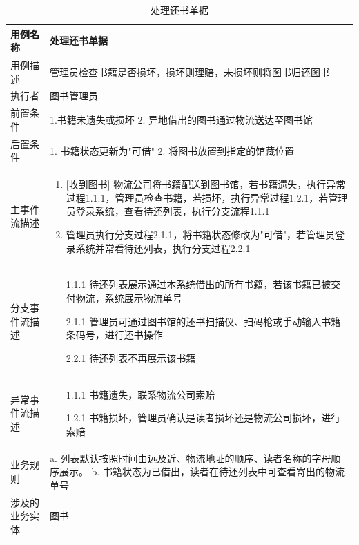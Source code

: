 \begin{table}[p]
    \centering
    \caption{处理还书单据}
	\begin{tabular*}{\textwidth}{p{}|p{}}
    \hline
    用例名称    & 处理还书单据   \\ \hline
    用例描述    & 管理员检查书籍是否损坏，损坏则理赔，未损坏则将图书归还图书   \\ \hline
    执行者     & 图书管理员        \\ \hline
    前置条件    & 1.书籍未遗失或损坏        2. 异地借出的图书通过物流送达至图书馆    \\ \hline
    后置条件    & 1. 书籍状态更新为"可借"       2. 将图书放置到指定的馆藏位置  \\ \hline
    主事件流描述  & \begin{enumerate} 
            \item  {[收到图书]} 物流公司将书籍配送到图书馆，若书籍遗失，执行异常过程1.1.1，管理员检查书籍，若损坏，执行异常过程1.2.1，若管理员登录系统，查看待还列表，执行分支流程1.1.1
            \item 管理员执行分支过程2.1.1，将书籍状态修改为"可借"，若管理员登录系统并常看待还列表，执行分支过程2.2.1
        \end{enumerate} \\ \hline
    分支事件流描述 & \begin{itemize}
        \item[1.1.1] 待还列表展示通过本系统借出的所有书籍，若该书籍已被交付物流，系统展示物流单号
        \item[2.1.1] 管理员可通过图书馆的还书扫描仪、扫码枪或手动输入书籍条码号，进行还书操作
        \item[2.2.1] 待还列表不再展示该书籍 
    \end{itemize}    \\ \hline
    异常事件流描述 & \begin{itemize}
        \item[1.1.1] 书籍遗失，联系物流公司索赔
        \item[1.2.1] 书籍损坏，管理员确认是读者损坏还是物流公司损坏，进行索赔
    \end{itemize}                                                                              \\ \hline
    业务规则    &  a. 列表默认按照时间由远及近、物流地址的顺序、读者名称的字母顺序展示。   b. 书籍状态为已借出，读者在待还列表中可查看寄出的物流单号  \\ \hline
    涉及的业务实体 & 图书     \\ \hline
\end{tabular*}
\end{table}
